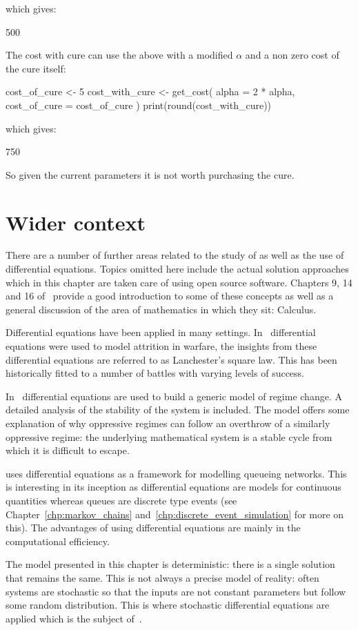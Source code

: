 which gives:

\begin{Rout}
[1] 500
\end{Rout}

The cost with cure can use the above with a modified \(\alpha\) and a non zero
cost of the cure itself:

\begin{Rin}
cost_of_cure <- 5
cost_with_cure <- get_cost(
  alpha = 2 * alpha, cost_of_cure = cost_of_cure
)
print(round(cost_with_cure))
\end{Rin}

which gives:

\begin{Rout}
[1] 750
\end{Rout}

So given the current parameters it is not worth purchasing the cure.

\section{Wider context}\label{sec:differential_equations_wider_context}

There are a number of further areas related to the study of as well as the use
of differential equations. Topics omitted here include the actual solution
approaches which in this chapter are taken
care of using open source software. Chapters 9, 14 and 16
of~\parencite{stewart2009calculus} provide a good introduction to some of
these concepts as well as a general discussion of the area of mathematics in
which they sit: Calculus.

Differential equations have been applied in many settings.
In~\parencite{lanchester1916aircraft} differential equations were used to model
attrition in warfare, the insights from these differential equations are
referred to as Lanchester's square law. This has been historically fitted to a
number of battles with varying levels of success.

In~\parencite{syms2015dynamic} differential equations are used to build a
generic model of regime change. A detailed analysis of the stability of the
system is included. The model offers some explanation of why oppressive regimes
can follow an overthrow of a similarly oppressive regime: the underlying
mathematical system is a stable cycle from which it is difficult to escape.

\parencite{vandergraft1983fluid} uses differential equations as a framework for
modelling queueing networks. This is interesting in its inception as
differential equations are models for continuous quantities whereas queues are
discrete type events (see Chapter~\ref{chp:markov_chains}
and~\ref{chp:discrete_event_simulation} for more on this). The advantages of
using differential equations are mainly in the computational efficiency.

The model presented in this chapter is deterministic: there is a single solution
that remains the same. This is not always a precise model of reality: often
systems are stochastic so that the inputs are not constant parameters but follow
some random distribution. This is where stochastic differential equations are
applied which is the subject of~\parencite{sarkka2019applied}.
